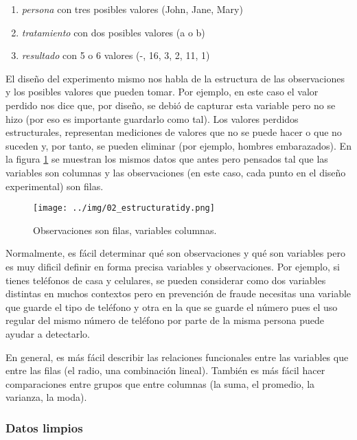 \documentclass[]{article}
\begin{document}
\begin{enumerate}
\def\labelenumi{\arabic{enumi}.}
\itemsep1pt\parskip0pt
\item
  \emph{persona} con tres posibles valores (John, Jane, Mary)
\item
  \emph{tratamiento} con dos posibles valores (a o b)
\item
  \emph{resultado} con 5 o 6 valores (-, 16, 3, 2, 11, 1)
\end{enumerate}

El diseño del experimento mismo nos habla de la estructura de las
observaciones y los posibles valores que pueden tomar. Por ejemplo, en
este caso el valor perdido nos dice que, por diseño, se debió de
capturar esta variable pero no se hizo (por eso es importante guardarlo
como tal). Los valores perdidos estructurales, representan mediciones de
valores que no se puede hacer o que no suceden y, por tanto, se pueden
eliminar (por ejemplo, hombres embarazados). En la figura
\ref{fig:estructuratidy} se muestran los mismos datos que antes pero
pensados tal que las variables son columnas y las observaciones (en este
caso, cada punto en el diseño experimental) son filas.

\begin{figure}[h]
    \centering
    \texttt{[image: ../img/02\_estructuratidy.png]}
    \caption{Observaciones son filas, variables columnas.}
    \label{fig:estructuratidy}
\end{figure}

Normalmente, es fácil determinar qué son observaciones y qué son
variables pero es muy dificil definir en forma precisa variables y
observaciones. Por ejemplo, si tienes teléfonos de casa y celulares, se
pueden considerar como dos variables distintas en muchos contextos pero
en prevención de fraude necesitas una variable que guarde el tipo de
teléfono y otra en la que se guarde el número pues el uso regular del
mismo número de teléfono por parte de la misma persona puede ayudar a
detectarlo.

En general, es más fácil describir las relaciones funcionales entre las
variables que entre las filas (el radio, una combinación lineal).
También es más fácil hacer comparaciones entre grupos que entre columnas
(la suma, el promedio, la varianza, la moda).

\subsubsection{Datos limpios}\label{datos-limpios-1}
\end{document}
